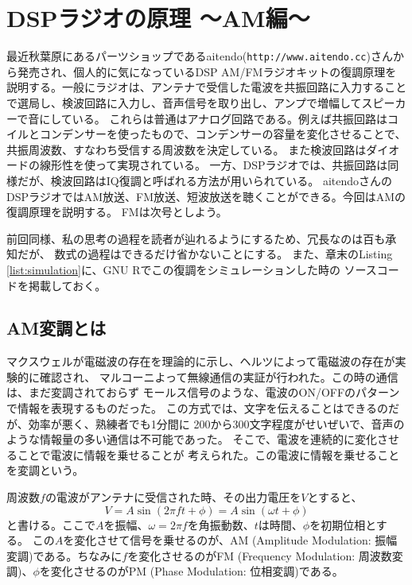 \chapter*{DSPラジオの原理 〜AM編〜}
最近秋葉原にあるパーツショップであるaitendo(\texttt{http://www.aitendo.cc})さんから発売され、個人的に気になっているDSP AM/FMラジオキットの復調原理を説明する。一般にラジオは、アンテナで受信した電波を共振回路に入力することで選局し、検波回路に入力し、音声信号を取り出し、アンプで増幅してスピーカーで音にしている。
%
これらは普通はアナログ回路である。例えば共振回路はコイルとコンデンサーを使ったもので、コンデンサーの容量を変化させることで、共振周波数、すなわち受信する周波数を決定している。
また検波回路はダイオードの線形性を使って実現されている。
一方、DSPラジオでは、共振回路は同様だが、検波回路はIQ復調と呼ばれる方法が用いられている。
aitendoさんのDSPラジオではAM放送、FM放送、短波放送を聴くことができる。今回はAMの復調原理を説明する。
FMは次号としよう。

前回同様、私の思考の過程を読者が辿れるようにするため、冗長なのは百も承知だが、
数式の過程はできるだけ省かないことにする。
また、章末のListing \ref{list:simulation}に、GNU Rでこの復調をシミュレーションした時の
ソースコードを掲載しておく。

\section*{AM変調とは}
マクスウェルが電磁波の存在を理論的に示し、ヘルツによって電磁波の存在が実験的に確認され、
マルコーニよって無線通信の実証が行われた。この時の通信は、まだ変調されておらず
モールス信号のような、電波のON/OFFのパターンで情報を表現するものだった。
この方式では、文字を伝えることはできるのだが、効率が悪く、熟練者でも1分間に
200から300文字程度がせいぜいで、音声のような情報量の多い通信は不可能であった。
そこで、電波を連続的に変化させることで電波に情報を乗せることが
考えられた。この電波に情報を乗せることを変調という。

周波数$f$の電波がアンテナに受信された時、その出力電圧を$V$とすると、
\begin{equation}
V = A\sin(2 \pi f t + \phi) = A\sin(\omega t + \phi)
\end{equation}
と書ける。ここで$A$を振幅、$\omega=2\pi f$を角振動数、$t$は時間、$\phi$を初期位相とする。
この$A$を変化させて信号を乗せるのが、AM (Amplitude Modulation: 振幅変調)である。ちなみに$f$を変化させるのがFM (Frequency Modulation: 周波数変調)、$\phi$を変化させるのがPM (Phase Modulation: 位相変調)である。

